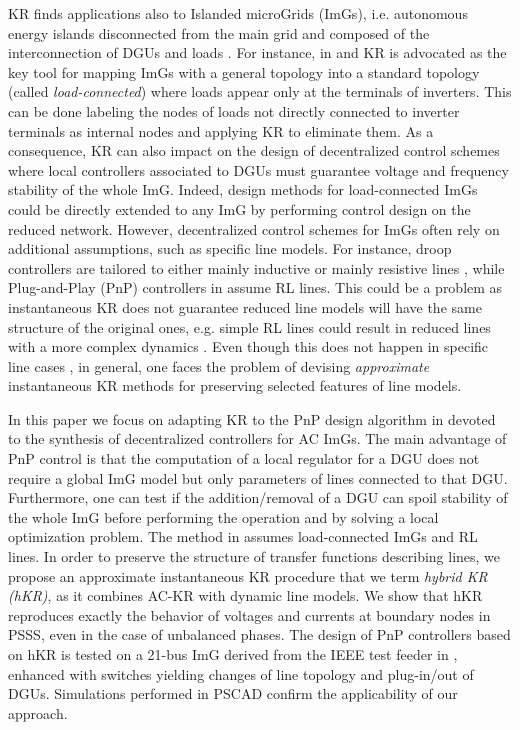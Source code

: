 \documentclass[a4paper]{article}
\theoremstyle{plain}
\begin{document}
KR finds applications also to Islanded microGrids (ImGs), i.e. autonomous energy islands disconnected from the main grid and composed of the interconnection of DGUs and loads \cite{guerrero2013advanced}. For instance, in \cite{luo2014spatiotemporal} and \cite{schiffer2014conditions} KR is advocated as the key tool for mapping ImGs with a general topology into a standard topology (called \textit{load-connected}) where loads appear only at the terminals of inverters. This can be done labeling the nodes of loads not directly connected to inverter terminals as internal nodes and applying KR to eliminate them. As a consequence, KR can also impact on the design of decentralized control schemes where local controllers associated to DGUs must guarantee voltage and frequency stability of the whole ImG. Indeed, design methods for load-connected ImGs could be directly extended to any ImG by performing control design on the reduced network. However, decentralized control schemes for ImGs often rely on additional assumptions, such as specific line models. For instance, droop controllers are tailored to either mainly inductive or mainly resistive lines \cite{guerrero2007decentralized}, while Plug-and-Play (PnP) controllers in \cite{riverso2015plug} assume RL lines.
This could be a problem as instantaneous KR does not guarantee reduced line models will have the same structure of the original ones, e.g. simple RL lines could result in reduced lines with a more complex dynamics \cite{dhople2014synchronization}. 
Even though this does not happen in specific line cases \cite{van2010characterization,caliskan2012kron}, in general, one faces the problem of devising \textit{approximate} instantaneous KR methods for preserving selected features of line models.


In this paper we focus on adapting KR to the PnP design algorithm in \cite{riverso2015plug} devoted to the synthesis of decentralized controllers for AC ImGs. The main advantage of PnP control is that the computation of a local regulator for a DGU does not require a global ImG model but only parameters of lines connected to that DGU.
Furthermore, one can test if the addition/removal of a DGU can spoil stability of the whole ImG before performing the operation and by solving a local optimization problem. The method in \cite{riverso2015plug} assumes load-connected ImGs and RL lines.
In order to preserve the structure of transfer functions describing lines, we propose an approximate instantaneous KR procedure that we term \emph{hybrid KR (hKR)}, as it combines AC-KR with dynamic line models. We show that hKR reproduces exactly the behavior of voltages and currents at boundary nodes in PSSS, even in the case of unbalanced phases. The design of PnP controllers based on hKR is tested on a 21-bus ImG derived from the IEEE test feeder in \cite{feeders2011ieee}, enhanced with switches yielding changes of line topology and plug-in/out of DGUs. Simulations performed in PSCAD confirm the applicability of our approach.
\end{document}
